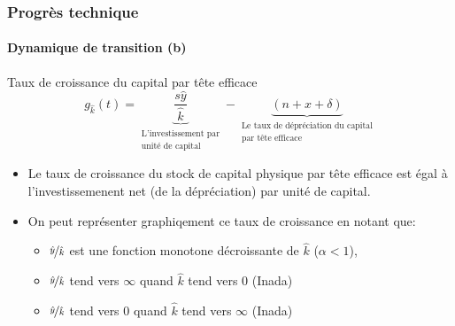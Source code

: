 \documentclass[10pt,notheorems]{beamer}
\theoremstyle{plain}
\theoremstyle{definition} %
\begin{document}
\begin{frame}
  \frametitle{Progrès technique}
  \framesubtitle{Dynamique de transition (b)}

  \begin{block}{Taux de croissance du capital par tête efficace}
    \[
      g_{\hat k}(t) = \underbrace{\frac{s\hat y}{\hat k}}_{\substack{\text{L'investissement par}\\\text{unité de capital}}} - \underbrace{(n+x+\delta)}_{\substack{\text{Le taux de dépréciation du capital}\\\text{par tête efficace}}}
    \]
  \end{block}

  \begin{itemize}

  \item Le taux de croissance du stock de capital physique par tête efficace est égal à l'investissemenent net (de la dépréciation) par unité de capital.\newline

  \item On peut représenter graphiqement ce taux de croissance en notant que:\newline
    \begin{itemize}

    \item $\nicefrac{\hat y}{\hat k}$ est une fonction monotone décroissante de $\hat k$ ($\alpha<1$),
    \item $\nicefrac{\hat y}{\hat k}$ tend vers $\infty$ quand $\hat k$ tend vers 0 (Inada)
    \item $\nicefrac{\hat y}{\hat k}$ tend vers $0$ quand $\hat k$ tend vers $\infty$ (Inada)
    \end{itemize}

  \end{itemize}

\end{frame}
\end{document}
